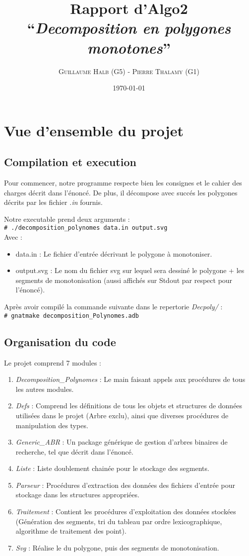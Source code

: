 \documentclass[10.9pt]{article}
\title{Rapport d'Algo2\\
  ``{\em Decomposition en polygones monotones}'' }
\author{\textsc{Guillaume Halb (G5)} - \textsc{Pierre Thalamy (G1)}}
\date{\today}
\newcommand{\shellcmd}[1]{\\\indent\indent\texttt{\footnotesize\# #1}\\}
\begin{document}
\maketitle

\section{Vue d'ensemble du projet}
\subsection{Compilation et execution}
Pour commencer, notre programme respecte bien les consignes et le
cahier des charges décrit dans l'énoncé. De plus, il décompose avec
succés les polygones décrits par les fichier \emph{.in} fournis.

Notre executable prend deux arguments :
\shellcmd{./decomposition\_polynomes data.in output.svg}
Avec : 
\begin{itemize}
  \item data.in : Le fichier d'entrée décrivant le polygone à
    monotoniser.
  \item output.svg : Le nom du fichier svg sur lequel sera dessiné le
    polygone + les segments de monotonisation (aussi affichés sur
    Stdout par respect pour l'énoncé).
\end{itemize}
Après avoir compilé la commande suivante dans le repertorie \emph{Decpoly/} :
\shellcmd{gnatmake decomposition\_Polynomes.adb}

\subsection{Organisation du code}

Le projet comprend 7 modules :
\begin{enumerate}
\item \emph{Decomposition\_Polynomes} : Le main faisant appels aux procédures de tous
  les autres modules.
\item \emph{Defs} : Comprend les définitions de tous les objets et
  structures de données utilisées dans le projet (Arbre exclu), ainsi que diverses
  procédures de manipulation des types.
\item \emph{Generic\_ABR} : Un package générique de gestion d'arbres
  binaires de recherche, tel que décrit dans l'énoncé. 
\item \emph{Liste} : Liste doublement chainée pour le stockage des
  segments.
\item \emph{Parseur} : Procédures d'extraction des données des fichiers
  d'entrée pour stockage dans les structures appropriées.
\item \emph{Traitement} : Contient les procédures d'exploitation des
  données stockées (Génération des segments, tri du
  tableau par ordre lexicographique, algorithme de traitement des point).
\item \emph{Svg} : Réalise le du polygone, puis des segments de monotonisation.
\end{enumerate}
\end{document}
